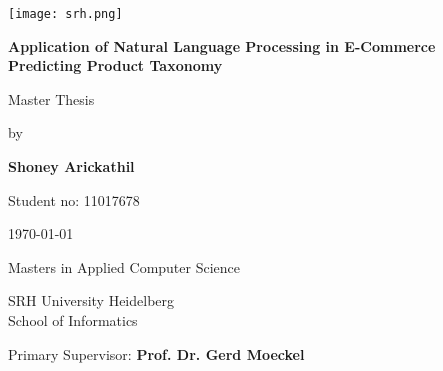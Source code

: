 \begin{titlepage}

    \vspace*{3\baselineskip}
        \begin{flushright}        
  
                \texttt{[image: srh.png]}
           
        \end{flushright}
    \vspace*{3\baselineskip}

    \centering
   


    {\Large \bfseries Application of Natural Language Processing in E-Commerce \\ Predicting Product Taxonomy}
    \vspace*{3\baselineskip}

    {\Large Master Thesis}
    \vspace*{1\baselineskip}

    {\Large by }
    \vspace*{2\baselineskip}

    {\Large  \bfseries Shoney Arickathil }
    \vspace*{0.5\baselineskip}

    {\Large  Student no: 11017678 }
    \vspace*{2\baselineskip}

    {\Large \today}
    \vspace*{8\baselineskip}


    {\Large  Masters in Applied Computer Science }
    \vspace*{0.5\baselineskip}

    {\Large  SRH University Heidelberg \\ School of Informatics}  
    \vspace*{6\baselineskip}

    \begin{minipage}{\textwidth}
        \begin{flushleft} %
            \large Primary Supervisor: \hfill \bfseries Prof. Dr. Gerd Moeckel
           
        \end{flushleft}
       
       
    \end{minipage}

    


   
    
\end{titlepage}